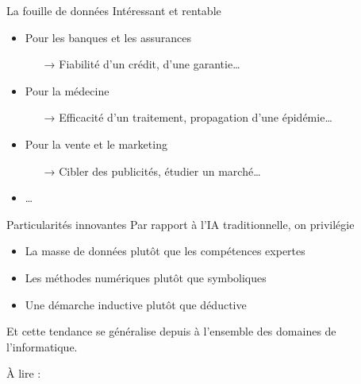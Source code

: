 \documentclass[hyperref={unicode}, xcolor={svgnames}, french]{beamer}
\begin{document}
\begin{frame}{La fouille de données}
    Intéressant et rentable
    \begin{itemize}
        \item Pour les banques et les assurances
            \begin{itemize}
                \item[→] Fiabilité d'un crédit, d'une garantie…
            \end{itemize}
        \item Pour la médecine
            \begin{itemize}
                \item[→] Efficacité d'un traitement, propagation d'une épidémie…
            \end{itemize}
        \item Pour la vente et le marketing
            \begin{itemize}
                \item[→] Cibler des publicités, étudier un marché…
            \end{itemize}
        \item …
    \end{itemize}
\end{frame}

\begin{frame}{Particularités innovantes}
    Par rapport à l'IA traditionnelle, on privilégie
    \begin{itemize}
        \item \alert{La masse de données} plutôt que les compétences expertes
        \item \alert{Les méthodes numériques} plutôt que symboliques
        \item Une démarche \alert{inductive} plutôt que déductive
    \end{itemize}
    Et cette tendance se généralise depuis à l'ensemble des domaines de l'informatique.

    À lire :  \parencite{church2011pendulum}
\end{frame}
\end{document}

